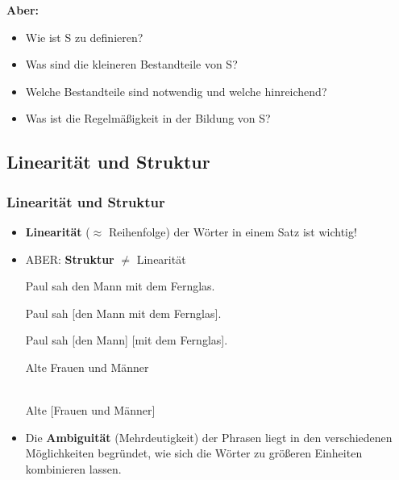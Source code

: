 \begin{frame}

\textbf{Aber: }
	\begin{itemize}
		\item Wie ist S zu definieren?
		\item Was sind die kleineren Bestandteile von S?
		\item Welche Bestandteile sind notwendig und welche hinreichend?
		\item Was ist die Regelmäßigkeit in der Bildung von S?
	\end{itemize}	 	

\end{frame}

\subsection{Linearität und Struktur}


\begin{frame}
\frametitle{Linearität und Struktur}

\begin{itemize}
	\item \textbf{Linearität} ($\approx$ Reihenfolge) der Wörter in einem Satz ist wichtig!
	
	\z
	
	\z

\end{itemize}

\end{frame}

\begin{frame}

\begin{itemize}
	\item ABER: \textbf{Struktur} $\neq$ Linearität
	
	\ea Paul sah den Mann mit dem Fernglas.

\pause 
	
		\ea Paul sah [den Mann mit dem Fernglas].\\ 
		\vs 
		
		\ex Paul sah [den 	Mann] [mit dem 	Fernglas].
		\z
	\z 

\pause 
	
	\ea Alte Frauen und Männer

\pause 
	
		\\
		\vs
		\ex Alte [Frauen und Männer]
		\z
	\z 

\pause 

	\item Die \textbf{Ambiguität} (Mehrdeutigkeit) der Phrasen liegt in den verschiedenen Möglichkeiten begründet, wie sich die Wörter zu größeren Einheiten kombinieren lassen.

\end{itemize}

\end{frame}


